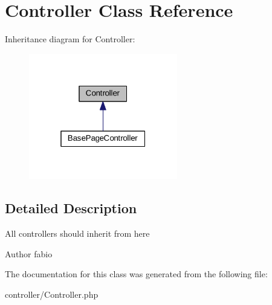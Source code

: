 \hypertarget{classController}{\section{Controller Class Reference}
\label{classController}
}


Inheritance diagram for Controller\+:\nopagebreak
\begin{figure}[H]
\begin{center}
\leavevmode
\includegraphics[width=184pt]{classController__inherit__graph}
\end{center}
\end{figure}


\subsection{Detailed Description}
All controllers should inherit from here

\begin{DoxyAuthor}{Author}
fabio 
\end{DoxyAuthor}


The documentation for this class was generated from the following file\+:\begin{DoxyCompactItemize}
\item 
controller/Controller.\+php\end{DoxyCompactItemize}
